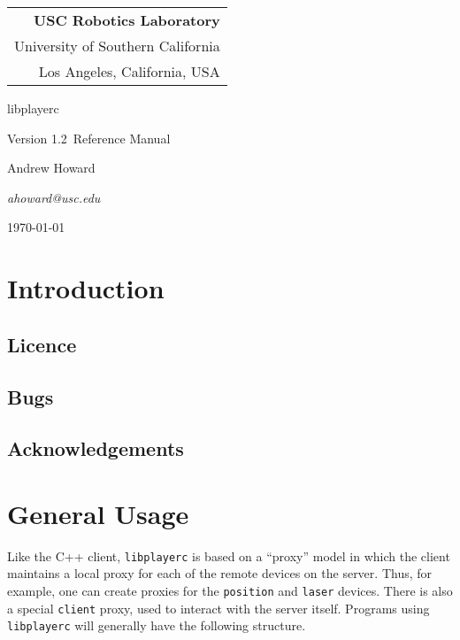 \documentclass[11pt]{report}
\def\VERSION {1.2}
\def\libplayerc {{\tt libplayerc} }
\begin{document}
\setcounter{page}{0}

\titlepage

\begin{flushright}
\begin{tabular}{r}
{\bf USC Robotics Laboratory}\\
University of Southern California\\
Los Angeles, California, USA\\
\end{tabular}
\end{flushright}

\vspace{5cm}
\centerline{\huge{libplayerc}}
\vspace{0.5cm}
\centerline{\large{Version \VERSION\ Reference Manual}}
\vspace{2cm}

\centerline{\large Andrew Howard}
\centerline{\sl ahoward@usc.edu}
\vspace{5cm}
\centerline{\today}

\newpage
\tableofcontents

\newpage
\setcounter{page}{0}

\chapter{Introduction}

\section{Licence}

\section{Bugs}

\section{Acknowledgements}

\chapter{General Usage}

Like the C++ client, \libplayerc is based on a ``proxy'' model in
which the client maintains a local proxy for each of the remote
devices on the server.  Thus, for example, one can create proxies for
the {\tt position} and {\tt laser} devices.  There is also a special
{\tt client} proxy, used to interact with the server itself.  Programs
using \libplayerc will generally have the following structure.
\end{document}
